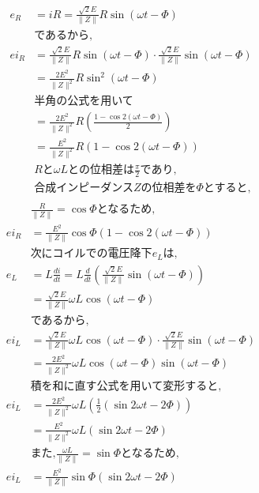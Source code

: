 \documentclass[twocolumn]{article}
\begin{document}
\begin{enumerate}
\begin{align*}
          e_R &= iR = \frac{\sqrt{2}E}{\|Z\|} R \sin \left( \omega t - \Phi\right)\\
          &\text{であるから,}\\
          ei_R&= \frac{\sqrt{2}E}{\|Z\|} R \sin \left( \omega t - \Phi\right) \cdot \frac{\sqrt{2}E}{\|Z\|} \sin \left( \omega t - \Phi\right)\\
              &= \frac{2E^2}{\|Z\|^2} R \sin^2 \left(\omega t - \Phi\right)\\
          &\text{半角の公式を用いて}\\
          &= \frac{2E^2}{\|Z\|^2} R \left( \frac{1-\cos2\left(\omega t - \Phi\right)}{2} \right)\\
          &= \frac{E^2}{\|Z\|^2} R \left( 1-\cos2\left(\omega t - \Phi\right)\right)\\
          &R\text{と}\omega L \text{との位相差は} \frac{\pi}{2} \text{であり,}\\
          &\text{合成インピーダンス}Z\text{の位相差を}\Phi \text{とすると,}\\
    \end{align*}
    \begin{align*}
      &\frac{R}{\|Z\|} = \cos \Phi \text{となるため,}\\
      ei_R&= \frac{E^2}{\|Z\|} \cos \Phi \left( 1-\cos2\left(\omega t - \Phi\right)\right)\\
      &\text{次にコイルでの電圧降下}e_L \text{は,}\\
      e_L &= L \frac{di}{dt} = L \frac{d}{dt} \left( \frac{\sqrt{2}E}{\|Z\|} \sin \left( \omega t - \Phi\right) \right)\\
          &= \frac{\sqrt{2}E}{\|Z\|} \omega L \cos \left(\omega t - \Phi\right)\\
      &\text{であるから,}\\
      ei_L&= \frac{\sqrt{2}E}{\|Z\|}\omega L \cos\left(\omega t - \Phi\right) \cdot \frac{\sqrt{2}E}{\|Z\|} \sin \left( \omega t - \Phi\right)\\
          &= \frac{2E^2}{\|Z\|^2} \omega L \cos\left(\omega t - \Phi\right)\sin\left(\omega t - \Phi\right)\\
      &\text{積を和に直す公式を用いて変形すると,}\\
      ei_L&= \frac{2E^2}{\|Z\|^2}\omega L \left(\frac{1}{2} \left(\sin 2\omega t - 2\Phi\right)\right) \\
          &= \frac{E^2}{\|Z\|^2}\omega L \left(\sin 2\omega t - 2\Phi\right)\\
      &\text{また,} \frac{\omega L}{\|Z\|} = \sin \Phi \text{となるため,}\\
      ei_L&= \frac{E^2}{\|Z\|}\sin \Phi \left(\sin 2\omega t - 2\Phi\right)\\
    \end{align*}


\end{enumerate}
\end{document}

